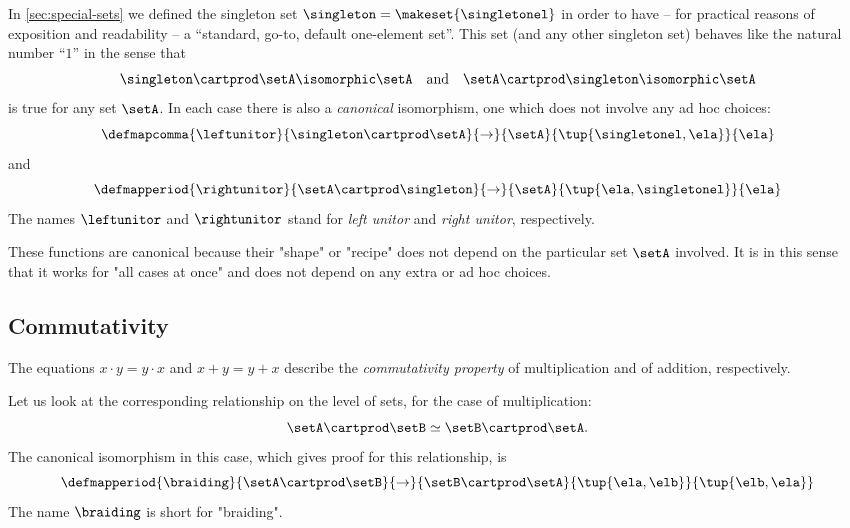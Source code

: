 In \cref{sec:special-sets} we defined the singleton set $\singleton = \makeset{\singletonel}$ in order to have -- for practical reasons of exposition and readability -- a ``standard, go-to, default one-element set''.  This set (and any other singleton set) behaves like the natural number ``$1$'' in the sense that
\begin{equation}
\singleton \cartprod \setA \isomorphic \setA \quad \text{and} \quad \setA \cartprod \singleton \isomorphic \setA
\end{equation}
is true for any set $\setA$. In each case there is also a \emph{canonical} isomorphism, one which does not involve any ad hoc choices:
\begin{equation}
 \defmapcomma{
           \leftunitor
        }{
            \singleton \cartprod \setA
        }{
            \to
        }{
            \setA
        }{
            \tup{\singletonel, \ela}
        }{
            \ela
        }
\end{equation}
and
\begin{equation}
 \defmapperiod{
           \rightunitor
        }{
            \setA \cartprod \singleton  
        }{
            \to
        }{
            \setA
        }{
            \tup{\ela, \singletonel}
        }{
            \ela
        }
\end{equation}
The names $\leftunitor$ and $\rightunitor$ stand for \emph{left unitor} and \emph{right unitor}, respectively. 
 
These functions are canonical because their "shape" or "recipe" does not depend on the particular set $\setA$ involved. 
It is in this sense that it works for "all cases at once" and does not depend on any extra or ad hoc choices.  

\subsection{Commutativity}
   
The equations $x \cdot y = y \cdot x$ and $x + y = y + x$ describe the \emph{commutativity property} of multiplication and of addition, respectively. 

Let us look at the corresponding relationship on the level of sets, for the case of multiplication:
\begin{equation}
\setA \cartprod \setB \simeq \setB \cartprod \setA. 
\end{equation}
The canonical isomorphism in this case, which gives proof for this relationship, is
 \begin{equation}
 \defmapperiod{
           \braiding
        }{
            \setA \cartprod \setB
        }{
            \to
        }{
            \setB \cartprod \setA
        }{
            \tup{\ela, \elb}
        }{
            \tup{\elb, \ela}
        }
\end{equation}
The name $\braiding$ is short for "braiding". 

